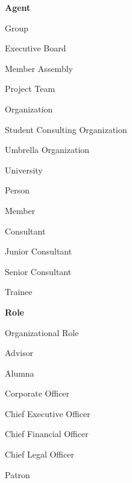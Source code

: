 \documentclass[a4paper, DIV=13, BCOR=0cm]{scrbook}
\begin{document}
\begin{multicols}{2}
	\begin{compactitem}
		\item \textbf{Agent}
		\begin{compactitem}
			\item Group
			\begin{compactitem}
				\item Executive Board
				\item Member Assembly
				\item Project Team
			\end{compactitem}
			\item Organization
			\begin{compactitem}
				\item Student Consulting Organization
				\item Umbrella Organization
				\item University
			\end{compactitem}
			\item Person
			\begin{compactitem}
				\item Member
				\begin{compactitem}
					\item Consultant
					\item Junior Consultant
					\item Senior Consultant
					\item Trainee
				\end{compactitem}
			\end{compactitem}
		\end{compactitem}
		\item \textbf{Role}
		\begin{compactitem}
			\item Organizational Role
			\begin{compactitem}
				\item Advisor
				\item Alumna
				\item Corporate Officer
				\begin{compactitem}
					\item Chief Executive Officer
					\item Chief Financial Officer
					\item Chief Legal Officer
				\end{compactitem}
				\item Patron
				\begin{compactitem}

\end{compactitem}
\end{compactitem}
\end{compactitem}
\end{compactitem}
\end{multicols}
\end{document}
